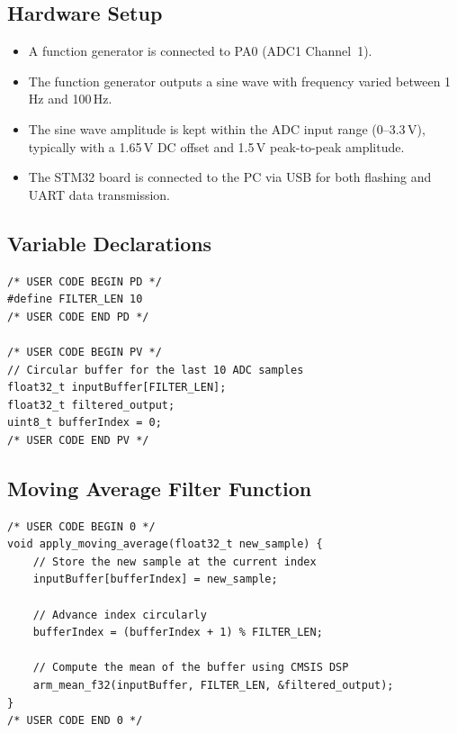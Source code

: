 \documentclass[12pt,a4paper]{article}
\begin{document}
\subsection{Hardware Setup}
\begin{itemize}
    \item A function generator is connected to PA0 (ADC1 Channel~1).
    \item The function generator outputs a sine wave with frequency varied between 1\,Hz and 100\,Hz.
    \item The sine wave amplitude is kept within the ADC input range (0--3.3\,V), typically with a 1.65\,V DC offset and 1.5\,V peak-to-peak amplitude.
    \item The STM32 board is connected to the PC via USB for both flashing and UART data transmission.
\end{itemize}

\subsection{Variable Declarations}

\begin{lstlisting}[caption=Task 2: Global Variables and Filter Definition]
/* USER CODE BEGIN PD */
#define FILTER_LEN 10
/* USER CODE END PD */

/* USER CODE BEGIN PV */
// Circular buffer for the last 10 ADC samples
float32_t inputBuffer[FILTER_LEN];
float32_t filtered_output;
uint8_t bufferIndex = 0;
/* USER CODE END PV */
\end{lstlisting}

\subsection{Moving Average Filter Function}

\begin{lstlisting}[caption=Task 2: Moving Average Filter Implementation]
/* USER CODE BEGIN 0 */
void apply_moving_average(float32_t new_sample) {
    // Store the new sample at the current index
    inputBuffer[bufferIndex] = new_sample;

    // Advance index circularly
    bufferIndex = (bufferIndex + 1) % FILTER_LEN;

    // Compute the mean of the buffer using CMSIS DSP
    arm_mean_f32(inputBuffer, FILTER_LEN, &filtered_output);
}
/* USER CODE END 0 */
\end{lstlisting}
\end{document}
